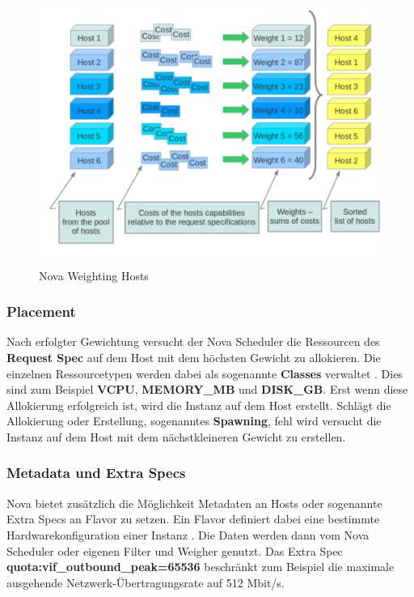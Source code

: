 \documentclass[../Main.tex]{subfiles}
\begin{document}
\begin{figure}[h]
    \centering
    \includegraphics[width=0.9\columnwidth]{Images/nova-weighting-hosts.png}
    \caption{Nova Weighting Hosts \citep{ComputeSchedulers}}
\end{figure}

\subsubsection{Placement}
\label{chapter:PlacementAPI}

Nach erfolgter Gewichtung versucht der Nova Scheduler die Ressourcen des \textbf{Request Spec} auf dem Host mit
dem höchsten Gewicht zu allokieren. Die einzelnen Ressourcetypen werden dabei als sogenannte \textbf{Classes} verwaltet \citep{PlacementDocs}.
Dies sind zum Beispiel \textbf{VCPU}, \textbf{{MEMORY\_MB}} und \textbf{{DISK\_GB}}. Erst wenn diese
Allokierung erfolgreich ist, wird die Instanz auf dem Host erstellt. Schlägt die Allokierung oder Erstellung, sogenanntes \textbf{Spawning}, fehl wird versucht
die Instanz auf dem Host mit dem nächstkleineren Gewicht zu erstellen.

\subsubsection{Metadata und Extra Specs}

Nova bietet zusätzlich die Möglichkeit Metadaten an Hosts oder sogenannte Extra Specs an Flavor zu setzen. Ein Flavor definiert
dabei eine bestimmte Hardwarekonfiguration einer Instanz \citep{FlavorDocs}. Die Daten werden dann vom Nova Scheduler
oder eigenen Filter und Weigher genutzt. Das Extra Spec \textbf{quota:vif\_outbound\_peak=65536} beschränkt zum Beispiel die maximale ausgehende Netzwerk-Übertragungsrate auf 512 Mbit/s.
\end{document}
